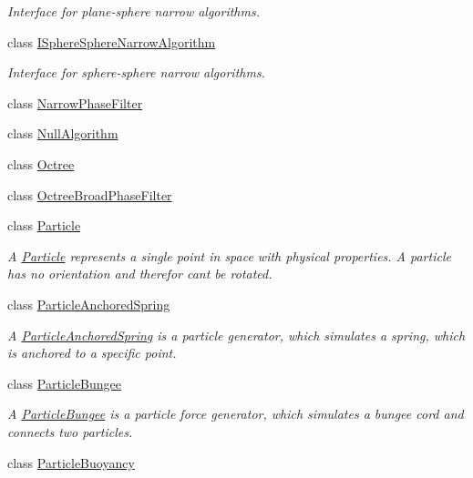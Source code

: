 \begin{DoxyCompactItemize}
\begin{DoxyCompactList}\small\item\em Interface for plane-\/sphere narrow algorithms. \end{DoxyCompactList}\item 
class \mbox{\hyperlink{classr3_1_1_i_sphere_sphere_narrow_algorithm}{I\+Sphere\+Sphere\+Narrow\+Algorithm}}
\begin{DoxyCompactList}\small\item\em Interface for sphere-\/sphere narrow algorithms. \end{DoxyCompactList}\item 
class \mbox{\hyperlink{classr3_1_1_narrow_phase_filter}{Narrow\+Phase\+Filter}}
\item 
class \mbox{\hyperlink{classr3_1_1_null_algorithm}{Null\+Algorithm}}
\item 
class \mbox{\hyperlink{classr3_1_1_octree}{Octree}}
\item 
class \mbox{\hyperlink{classr3_1_1_octree_broad_phase_filter}{Octree\+Broad\+Phase\+Filter}}
\item 
class \mbox{\hyperlink{classr3_1_1_particle}{Particle}}
\begin{DoxyCompactList}\small\item\em A \mbox{\hyperlink{classr3_1_1_particle}{Particle}} represents a single point in space with physical properties. A particle has no orientation and therefor can\textquotesingle{}t be rotated. \end{DoxyCompactList}\item 
class \mbox{\hyperlink{classr3_1_1_particle_anchored_spring}{Particle\+Anchored\+Spring}}
\begin{DoxyCompactList}\small\item\em A \mbox{\hyperlink{classr3_1_1_particle_anchored_spring}{Particle\+Anchored\+Spring}} is a particle generator, which simulates a spring, which is anchored to a specific point. \end{DoxyCompactList}\item 
class \mbox{\hyperlink{classr3_1_1_particle_bungee}{Particle\+Bungee}}
\begin{DoxyCompactList}\small\item\em A \mbox{\hyperlink{classr3_1_1_particle_bungee}{Particle\+Bungee}} is a particle force generator, which simulates a bungee cord and connects two particles. \end{DoxyCompactList}\item 
class \mbox{\hyperlink{classr3_1_1_particle_buoyancy}{Particle\+Buoyancy}}

\end{DoxyCompactItemize}
